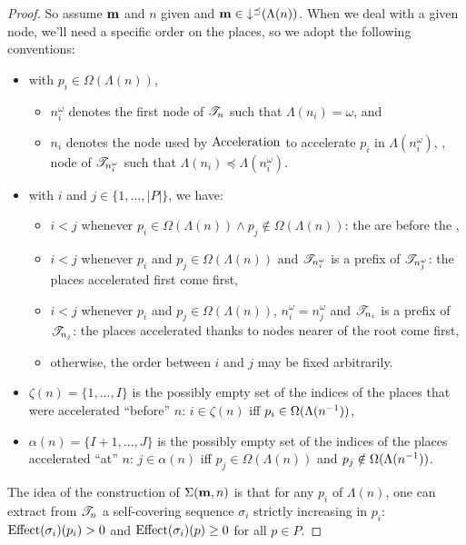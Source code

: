 \begin{proof}
  So assume $\mathbf{m}$ and $n$ given and $\mathbf{m} \in \operatorname{\downarrow^\preceq}(\Lambda(n))$.
  When we deal with a given node, we'll need a specific order on the places, so we adopt the following conventions:
  \begin{itemize}
    \item with $p_i \in \Omega(\Lambda(n))$,
      \begin{itemize}
        \item $n^\omega_i$ denotes the first node of $\mathscr{T}_{n}$ such that $\Lambda(n_i) = \omega$, and
        \item $n_i$ denotes the node used by $\operatorname{Acceleration}$ to accelerate $p_i$ in $\Lambda(n^\omega_i)$, ,  node of $\mathscr{T}_{n^\omega_i}$ such that $\Lambda(n_i) \preceq \Lambda(n^\omega_i)$.
      \end{itemize}
    \item with $i$ and $j \in \{1, …, |P|\}$, we have:
      \begin{itemize}
        \item $i < j$ whenever $p_i \in \Omega(\Lambda(n)) \wedge p_j \notin \Omega(\Lambda(n))$:
          the \oplaces are before the \noplaces,
        \item $i < j$ whenever $p_i$ and $p_j \in \Omega(\Lambda(n))$ and $\mathscr{T}_{n^\omega_i}$ is a prefix of $\mathscr{T}_{n^\omega_j}$:
          the places accelerated first come first,
        \item $i < j$ whenever $p_i$ and $p_j \in \Omega(\Lambda(n))$, $n^\omega_i = n^\omega_j$ and $\mathscr{T}_{n_i}$ is a prefix of $\mathscr{T}_{n_j}$:
          the places accelerated thanks to nodes nearer of the root come first,
        \item otherwise, the order between $i$ and $j$ may be fixed arbitrarily.
      \end{itemize}
    \item $\zeta(n) = \{1, ..., I\}$ is the possibly empty set of the indices of the places that were accelerated ``before'' $n$: $i \in \zeta(n)$ iff $p_i \in \Omega(\Lambda(n^{-1}))$,
    \item $\alpha(n) = \{I+1, ..., J\}$ is the possibly empty set of the indices of the places accelerated ``at'' $n$: $j \in \alpha(n)$ iff $p_j \in \Omega(\Lambda(n))$ and $p_j \notin \Omega(\Lambda(n^{-1}))$.
  \end{itemize}

  The idea of the construction of $\Sigma(\mathbf{m}, n)$ is that for any \oplace $p_i$ of $\Lambda(n)$, one can extract from $\mathscr{T}_{n}$ a self-covering sequence $\sigma_i$ strictly increasing in $p_i$:
  $\operatorname{Effect}(\sigma_i)(p_i) > 0$ and $\operatorname{Effect}(\sigma_i)(p) \geq 0$ for all $p \in P$.


\end{proof}
